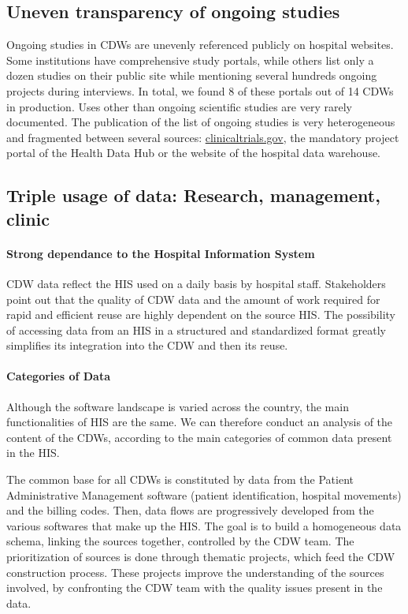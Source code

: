 \documentclass[french,12pt,twoside,a4paper]{book}
\begin{document}
\subsection{Uneven transparency of ongoing studies}%
\label{subsec:cdw:results:transparency}%

Ongoing studies in CDWs are unevenly referenced publicly on hospital websites.
Some institutions have comprehensive study portals, while others list only a
dozen studies on their public site while mentioning several hundreds ongoing
projects during interviews. In total, we found 8 of these portals out of 14 CDWs
in production. Uses other than ongoing scientific studies are very rarely
documented. The publication of the list of ongoing studies is very heterogeneous
and fragmented between several sources: \url{clinicaltrials.gov}, the mandatory
project portal of the Health Data Hub \citep{health_data_hub_portal_2023} or the
website of the hospital data warehouse.

\subsection{Triple usage of data: Research, management, clinic}%
\label{subsec:cdw:results:data}%

\paragraph{Strong dependance to the Hospital Information System}

CDW data reflect the HIS used on a daily basis by hospital staff. Stakeholders
point out that the quality of CDW data and the amount of work required for rapid
and efficient reuse are highly dependent on the source HIS. The possibility of
accessing data from an HIS in a structured and standardized format greatly
simplifies its integration into the CDW and then its reuse.

\paragraph{Categories of Data}

Although the software landscape is varied across the country, the main
functionalities of HIS are the same. We can therefore conduct an analysis of the
content of the CDWs, according to the main categories of common data present in
the HIS.

The common base for all CDWs is constituted by data from the Patient
Administrative Management software (patient identification, hospital movements)
and the billing codes. Then, data flows are progressively developed from the
various softwares that make up the HIS. The goal is to build a homogeneous data
schema, linking the sources together, controlled by the CDW team. The
prioritization of sources is done through thematic projects, which feed the CDW
construction process. These projects improve the understanding of the sources
involved, by confronting the CDW team with the quality issues present in the
data.
\end{document}
